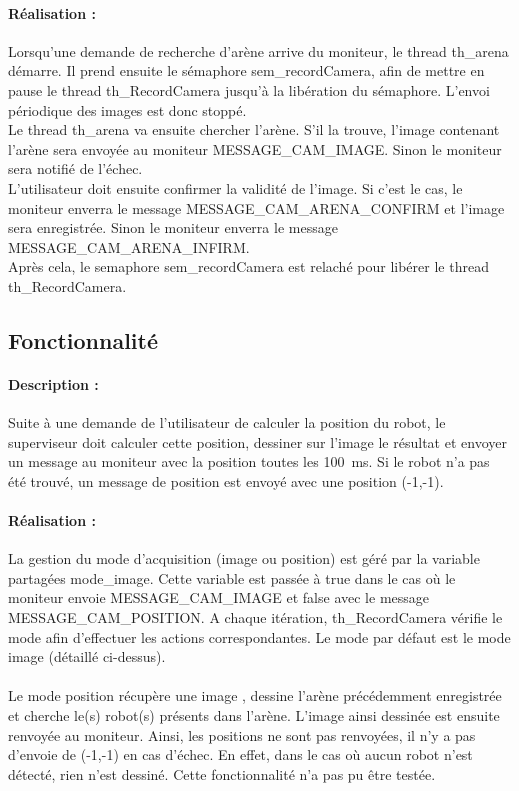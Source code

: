 \documentclass[11pt, a4paper]{paper}
\newcounter{cptreq}
\begin{document}
{{\paragraph{\color{black}Réalisation :}  {\color{black} Lorsqu'une demande de recherche d'arène arrive du moniteur, le thread th\_arena démarre. Il prend ensuite le sémaphore sem\_recordCamera, afin de mettre en pause le thread th\_RecordCamera jusqu'à la libération du sémaphore. L'envoi périodique des images est donc stoppé.\\
Le thread th\_arena va ensuite chercher l'arène. S'il la trouve, l'image contenant l'arène sera envoyée au moniteur MESSAGE\_CAM\_IMAGE. Sinon le moniteur sera notifié de l'échec.\\
L'utilisateur doit ensuite confirmer la validité de l'image. Si c'est le cas, le moniteur enverra le message MESSAGE\_CAM\_ARENA\_CONFIRM et l'image sera enregistrée. Sinon le moniteur enverra le message MESSAGE\_CAM\_ARENA\_INFIRM. \\
Après cela, le semaphore sem\_recordCamera est relaché pour libérer le thread th\_RecordCamera.}

\subsection{Fonctionnalité \thecptreq}

\paragraph{Description :} Suite à une demande de l'utilisateur de calculer la position du robot, le superviseur doit calculer cette position, dessiner sur l'image le résultat et envoyer un message au moniteur avec la position toutes les 100~ms. Si le robot n'a pas été trouvé, un message de position est envoyé avec une position (-1,-1).

\paragraph{\color{black}Réalisation :}  {\color{black} La gestion du mode d'acquisition (image ou position) est géré par la variable partagées mode\_image. Cette variable est passée à true dans le cas où le moniteur envoie MESSAGE\_CAM\_IMAGE et false avec le message MESSAGE\_CAM\_POSITION. A chaque itération, th\_RecordCamera vérifie le mode afin d'effectuer les actions correspondantes. Le mode par défaut est le mode image (détaillé ci-dessus).\\ \\
Le mode position récupère une image , dessine l'arène précédemment enregistrée et cherche le(s) robot(s) présents dans l'arène. L'image ainsi dessinée est ensuite renvoyée au moniteur. Ainsi, les positions ne sont pas renvoyées, il n'y a pas d'envoie de (-1,-1) en cas d'échec. En effet, dans le cas où aucun robot n'est détecté, rien n'est dessiné. Cette fonctionnalité n'a pas pu être testée.}
}}
\end{document}
